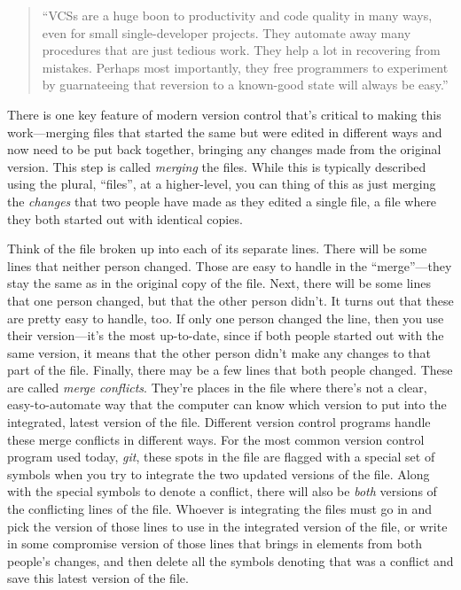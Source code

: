 \documentclass[]{tufte-book}
\begin{document}
\begin{quote}
``VCSs are a huge boon to productivity and code quality in many ways, even for small
single-developer projects. They automate away many procedures that are just tedious
work. They help a lot in recovering from mistakes. Perhaps most importantly, they
free programmers to experiment by guarnateeing that reversion to a known-good
state will always be easy.'' \citep{raymond2003art}
\end{quote}

There is one key feature of modern version control that's
critical to making this work---merging files that started the same but were edited in
different ways and now need to be put back together, bringing any changes made from the
original version. This step is called \emph{merging} the files. While this is typically
described using the plural, ``files'', at a higher-level, you can thing of this as
just merging the \emph{changes} that two people have made as they edited a single file, a
file where they both started out with identical copies.

Think of the file broken up into each of its separate lines. There will be some lines
that neither person changed. Those are easy to handle in the ``merge''---they stay the
same as in the original copy of the file. Next, there will be some lines that one
person changed, but that the other person didn't. It turns out that these are pretty
easy to handle, too. If only one person changed the line, then you use their version---it's
the most up-to-date, since if both people started out with the same version, it means
that the other person didn't make any changes to that part of the file.
Finally, there may be a few lines that both people changed. These are called \emph{merge conflicts}.
They're places in the file where there's not a clear, easy-to-automate way that
the computer can know which version to put into the integrated, latest version of the
file. Different version control programs handle these merge conflicts in different ways.
For the most common version control program used today, \emph{git}, these spots in the
file are flagged with a special set of symbols when you try to integrate the two updated
versions of the file. Along with the special symbols to denote a conflict, there will
also be \emph{both} versions of the conflicting lines of the file. Whoever is integrating the
files must go in and pick the version of those lines to use in the integrated version
of the file, or write in some compromise version of those lines that brings in elements
from both people's changes, and then delete all the symbols denoting that was a conflict
and save this latest version of the file.
\end{document}
